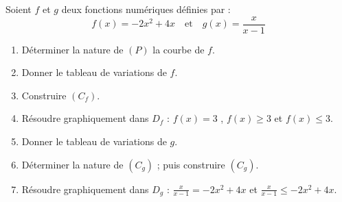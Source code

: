 \begin{Exercice}
Soient $f$ et $g$ deux fonctions numériques définies par :
$$f(x) = -2x^2 + 4x \quad \text{et} \quad g(x) = \frac{x}{x - 1}$$

\begin{enumerate}
    \item Déterminer la nature de $(P)$ la courbe de $f$.
    \item Donner le tableau de variations de $f$.
    \item Construire $(C_f)$.
    \item Résoudre graphiquement dans $D_f$ : $f(x) = 3$ , $f(x) \geq 3$ et $f(x) \leq 3$.
    \item Donner le tableau de variations de $g$.
    \item Déterminer la nature de $(C_g)$ ; puis construire $(C_g)$.
    \item Résoudre graphiquement dans $D_g$ : $\frac{x}{x-1} = -2x^2 + 4x$ et $\frac{x}{x-1} \leq -2x^2 + 4x$.
\end{enumerate}
\end{Exercice}
